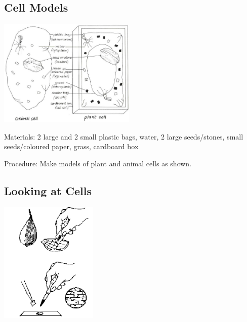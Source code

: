 \begin{multicols}{2}
\subsection{Cell Models}

\begin{center}
\includegraphics[width=0.49\textwidth]{./img/vso/cell-models.jpg}
\end{center}

\begin{description*}
\item[Materials:]{2 large and 2 small plastic bags, water, 2 large seeds/stones, small seeds/coloured paper, grass, cardboard box}
\item[Procedure:]{Make models of plant and animal cells as shown.}
\end{description*}

\subsection{Looking at Cells} %

\begin{center}
\includegraphics[width=0.35\textwidth]{./img/source/looking-cells.png}
\end{center}


\end{multicols}
